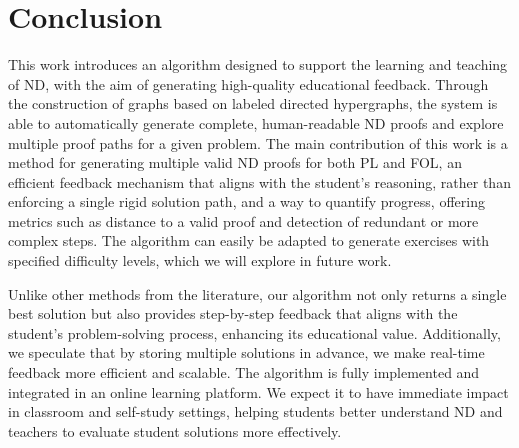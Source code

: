 \section{Conclusion}
This work introduces an algorithm designed to support the learning and teaching of ND, with the aim of generating high-quality educational feedback. Through the construction of graphs based on labeled directed hypergraphs, the system is able to automatically generate complete, human-readable ND proofs and explore multiple proof paths for a given problem.
The main contribution of this work is a method for generating multiple valid ND proofs for both PL and FOL, an efficient feedback mechanism that aligns with the student’s reasoning, rather than enforcing a single rigid solution path, and a way to quantify progress, offering metrics such as distance to a valid proof and detection of redundant or more complex steps.
The algorithm can easily be adapted to generate exercises with specified difficulty levels, which we will explore in future work. 

Unlike other methods from the literature, our algorithm not only returns a single best solution but also provides step-by-step feedback that aligns with the student’s problem-solving process, enhancing its educational value. Additionally, we speculate that by storing multiple solutions in advance, we make real-time feedback more efficient and scalable.
%
The algorithm is fully implemented and integrated in an online learning platform. We expect it to have immediate impact in classroom and self-study settings, helping students better understand ND and teachers to evaluate student solutions more effectively.
